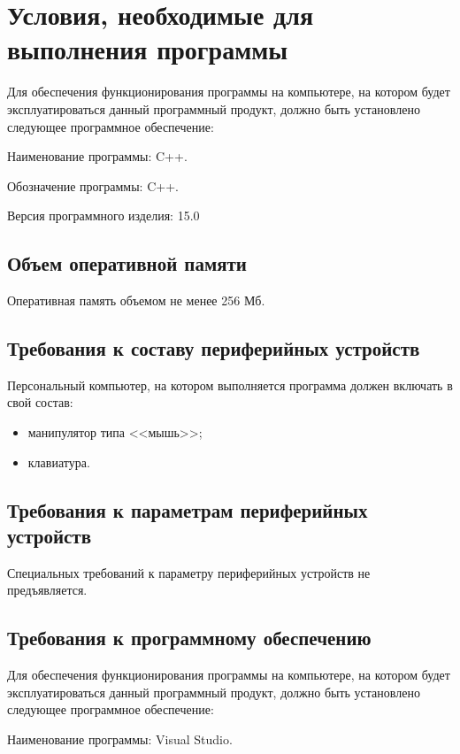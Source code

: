 \documentclass[14pt,a4paper,final]{extreport}
\begin{document}
\section{Условия, необходимые для выполнения программы}

Для обеспечения функционирования программы на компьютере, на котором будет эксплуатироваться данный программный продукт, должно быть установлено следующее программное обеспечение:

Наименование программы: C++.

Обозначение программы: C++.

Версия программного изделия: 15.0

\subsection{Объем оперативной памяти}

Оперативная память объемом не менее 256 Мб.

\subsection{Требования к составу периферийных устройств}

Персональный компьютер, на котором выполняется программа должен включать в свой состав:

\begin{itemize}
	\item манипулятор типа <<мышь>>;
	\item клавиатура.
\end{itemize}

\subsection{Требования к параметрам периферийных устройств}

Специальных требований к параметру периферийных устройств не предъявляется.

\subsection{Требования к программному обеспечению}

Для обеспечения функционирования программы на компьютере, на котором будет эксплуатироваться данный программный продукт, должно быть установлено следующее программное обеспечение:

Наименование программы: Visual Studio.
\end{document}
